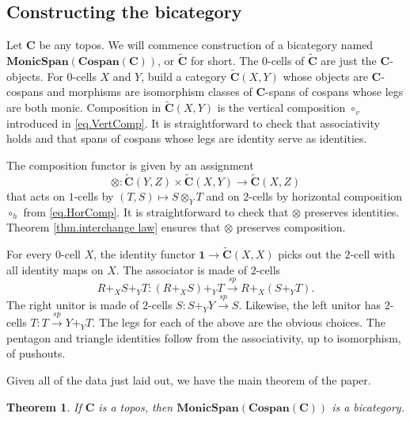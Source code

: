 \documentclass[11pt]{amsart}
\newcommand{\cat}[1]{\mathbf{#1}}
\newcommand{\from}{\colon}
\renewcommand{\span}{\xrightarrow{\mathit{sp}}}
\newcommand{\csC}{\widetilde{\mathbf{C}}}
\newtheorem{thm}{Theorem}[section]
\theoremstyle{remark}
\theoremstyle{definition}
\begin{document}
%
%
%
%
%
%
\subsection{Constructing the bicategory}  %
%
%
%
%
%
%
%

Let $\cat{C}$ be any topos. We will commence construction of a bicategory named $\cat{MonicSpan(Cospan(C))}$, or $\csC$ for short. The $0$-cells of $\csC$ are just the $\cat{C}$-objects. For $0$-cells $X$ and $Y$, build a category $\csC(X,Y)$ whose objects are $\cat{C}$-cospans and morphisms are isomorphism classes of $\cat{C}$-spans of cospans whose legs are both monic. Composition in $\csC (X,Y)$ is the vertical composition $\circ_v$ introduced in \eqref{eq.VertComp}. It is straightforward to check that associativity holds and that spans of cospans whose legs are identity serve as identities.
%
%
%
%
%
%

The composition functor is given by an assignment
\[
\otimes \from \csC(Y,Z) \times \csC(X,Y) \to \csC(X,Z)
\]
that acts on $1$-cells by $(T,S) \mapsto S \otimes_Y T$ and on $2$-cells by horizontal composition $\circ_h$ from \eqref{eq.HorComp}. It is straightforward to check that $\otimes$ preserves identities. Theorem \ref{thm.interchange law} ensures that $\otimes$ preserves composition.
%
%
%
%
%

For every $0$-cell $X$, the identity functor $\cat{1} \to \csC (X,X)$ picks out the $2$-cell with all identity maps on $X$. The associator is made of $2$-cells 
\[
R+_XS+_YT \from (R+_XS)+_YT \span R+_X(S+_YT).
\] 
The right unitor is made of $2$-cells $S \from S+_YY \span S$. Likewise, the left unitor has $2$-cells $T \from T \span Y+_YT$. The legs for each of the above are the obvious choices. The pentagon and triangle identities follow from the associativity, up to isomorphism, of pushouts. 
%
%
%
%
%

Given all of the data just laid out, we have the main theorem of the paper.

\begin{thm}
	If $\cat{C}$ is a topos, then $\cat{MonicSpan(Cospan(C))}$ is a bicategory.
\end{thm}
%
%
%
%
%
%
%
%
\end{document}
